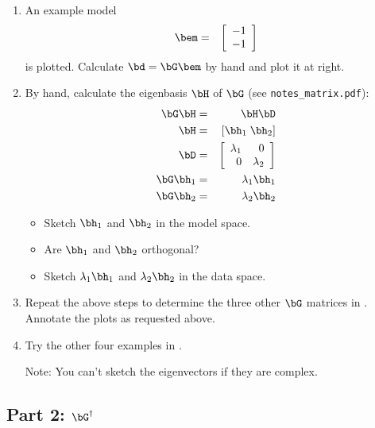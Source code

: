 \documentclass[11pt,titlepage,fleqn]{article}
\begin{document}
\begin{enumerate}
\item An example model
%
\begin{eqnarray}
\bem  &=& \left[ \begin{array}{c} -1 \\ -1 \end{array} \right]
\end{eqnarray}
%
is plotted. Calculate $\bd = \bG\bem$ by hand and plot it at right.

\item By hand, calculate the eigenbasis $\bH$ of $\bG$ (see \verb+notes_matrix.pdf+):
%
\begin{eqnarray}
\bG\bH  &=& \bH \bD
\\
\bH &=& [\bh_1\;\bh_2]
\\
\bD &=& \left[ \begin{array}{rr}
     \lambda_1  &  0  \\
     0  &  \lambda_2  \\
\end{array} \right]
\\
\bG\bh_1 &=& \lambda_1\bh_1
\\
\bG\bh_2 &=& \lambda_2\bh_2
\end{eqnarray}
%
\begin{itemize}
\item Sketch $\bh_1$ and $\bh_2$ in the model space.
\item Are $\bh_1$ and $\bh_2$ orthogonal?
\item Sketch $\lambda_1\bh_1$ and $\lambda_2\bh_2$ in the data space.
\end{itemize}

\item Repeat the above steps to determine the three other $\bG$ matrices in . Annotate the plots as requested above.

\item Try the other four examples in .

Note: You can't sketch the eigenvectors if they are complex.

\end{enumerate}



\subsection*{Part 2: $\bG^{\dagger}$}
\end{document}
